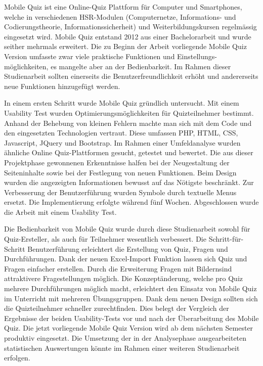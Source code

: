 

Mobile Quiz ist eine Online-Quiz Plattform für Computer und Smartphones, welche in verschiedenen HSR-Modulen (Computernetze, Informations- und Codierungstheorie, Informationssicherheit) und Weiterbildungskursen regelmässig eingesetzt wird. Mobile Quiz entstand 2012 aus einer Bachelorarbeit und wurde seither mehrmals erweitert. Die zu Beginn der Arbeit vorliegende Mobile Quiz Version umfasste zwar viele praktische Funktionen und Einstellungs-möglichkeiten, es mangelte aber an der Bedienbarkeit. Im Rahmen dieser Studienarbeit sollten einerseits die Benutzerfreundlichkeit erhöht und andererseits neue Funktionen hinzugefügt werden.

\bigskip

In einem ersten Schritt wurde Mobile Quiz gründlich untersucht. Mit einem Usability Test wurden Optimierungsmöglichkeiten für Quizteilnehmer bestimmt. Anhand der Behebung von kleinen Fehlern machte man sich mit dem Code und den eingesetzten Technologien vertraut. Diese umfassen PHP, HTML, CSS, Javascript, JQuery und Bootstrap. Im Rahmen einer Umfeldanalyse wurden ähnliche Online Quiz-Plattformen gesucht, getestet und bewertet. Die aus dieser Projektphase gewonnenen Erkenntnisse halfen bei der Neugestaltung der Seiteninhalte sowie bei der Festlegung von neuen Funktionen. Beim Design wurden die angezeigten Informationen bewusst auf das Nötigste beschränkt. Zur Verbesserung der Benutzerführung wurden Symbole durch textuelle Menus ersetzt. Die Implementierung erfolgte während fünf Wochen. Abgeschlossen wurde die Arbeit mit einem Usability Test.

\bigskip

Die Bedienbarkeit von Mobile Quiz wurde durch diese Studienarbeit sowohl für Quiz-Ersteller, als auch für Teilnehmer wesentlich verbessert. Die Schritt-für-Schritt Benutzerführung erleichtert die Erstellung von Quiz, Fragen und Durchführungen. Dank der neuen Excel-Import Funktion lassen sich Quiz und Fragen einfacher erstellen. Durch die Erweiterung \glqq Fragen mit Bildern\grqq sind attraktivere Fragestellungen möglich. Die Konzeptänderung, welche pro Quiz mehrere Durchführungen möglich macht, erleichtert den Einsatz von Mobile Quiz im Unterricht mit mehreren Übungsgruppen. Dank dem neuen Design sollten sich die Quizteilnehmer schneller zurechtfinden. Dies belegt der Vergleich der Ergebnisse der beiden \gls{Usability-Test}s vor und nach der Überarbeitung des Mobile Quiz. Die jetzt vorliegende Mobile Quiz Version wird ab dem nächsten Semester produktiv eingesetzt. Die Umsetzung der in der Analysephase ausgearbeiteten statistischen Auswertungen könnte im Rahmen einer weiteren Studienarbeit erfolgen.